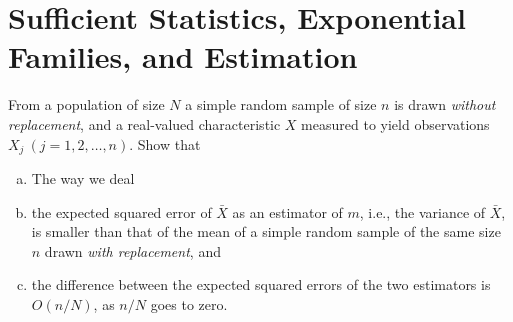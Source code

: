 \chapter{Sufficient Statistics, Exponential Families, and Estimation}
\begin{exer}
From a population of size $N$ a simple random sample of size $n$ is drawn \textit{without replacement}, and a real-valued characteristic $X$ measured to yield observations $X_j~(j=1,2,\ldots,n)$. Show that
\begin{enumerate}[(a)]
	\item 
	The way we deal
	\item the expected squared error of $\bar{X}$ as an estimator of $m$, i.e., the variance of $\bar{X}$, is smaller than that of the mean of a simple random sample of the same size $n$ drawn \textit{with replacement}, and
	\item the difference between the expected squared errors of the two estimators is $O(n/N)$, as $n/N$ goes to zero.
\end{enumerate}
\end{exer}
